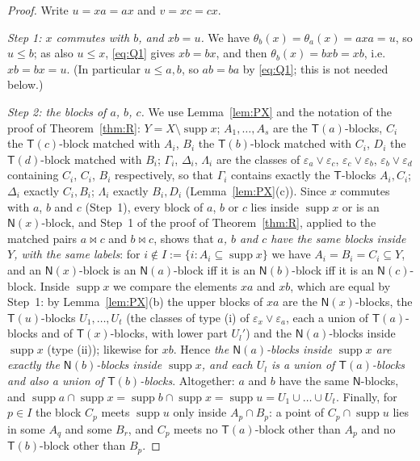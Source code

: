 \documentclass[11pt]{amsart}
\theoremstyle{definition}
\newcommand{\supp}{\operatorname{supp}}
\newcommand{\T}{\mathsf{T}}
\newcommand{\N}{\mathsf{N}}
\newcommand{\mt}{\bowtie}   %
\begin{document}
\begin{proof}
Write $u=xa=ax$ and $v=xc=cx$.

\smallskip
\emph{Step 1: $x$ commutes with $b$, and $xb=u$.} We have $\theta_b(x)=\theta_a(x)=axa=u$, so $u\le b$; as also $u\le x$, \eqref{eq:Q1} gives $xb=bx$, and then $\theta_b(x)=bxb=xb$, i.e.\ $xb=bx=u$. (In particular $u\le a,b$, so $ab=ba$ by \eqref{eq:Q1}; this is not needed below.)

\smallskip
\emph{Step 2: the blocks of $a$, $b$, $c$.} We use Lemma~\ref{lem:PX} and the notation of the proof of Theorem~\ref{thm:R}: $Y=X\setminus\supp x$; $A_1,\dots,A_s$ are the $\T(a)$-blocks, $C_i$ the $\T(c)$-block matched with $A_i$, $B_i$ the $\T(b)$-block matched with $C_i$, $D_i$ the $\T(d)$-block matched with $B_i$; $\Gamma_i$, $\Delta_i$, $\Lambda_i$ are the classes of $\varepsilon_a\vee\varepsilon_c$, $\varepsilon_c\vee\varepsilon_b$, $\varepsilon_b\vee\varepsilon_d$ containing $C_i$, $C_i$, $B_i$ respectively, so that $\Gamma_i$ contains exactly the $\T$-blocks $A_i,C_i$; $\Delta_i$ exactly $C_i,B_i$; $\Lambda_i$ exactly $B_i,D_i$ (Lemma~\ref{lem:PX}(c)). Since $x$ commutes with $a$, $b$ and $c$ (Step~1), every block of $a$, $b$ or $c$ lies inside $\supp x$ or is an $\N(x)$-block, and Step~1 of the proof of Theorem~\ref{thm:R}, applied to the matched pairs $a\mt c$ and $b\mt c$, shows that \emph{$a$, $b$ and $c$ have the same blocks inside $Y$, with the same labels}: for $i\notin I:=\{i:A_i\subseteq\supp x\}$ we have $A_i=B_i=C_i\subseteq Y$, and an $\N(x)$-block is an $\N(a)$-block iff it is an $\N(b)$-block iff it is an $\N(c)$-block. Inside $\supp x$ we compare the elements $xa$ and $xb$, which are equal by Step~1: by Lemma~\ref{lem:PX}(b) the upper blocks of $xa$ are the $\N(x)$-blocks, the $\T(u)$-blocks $U_1,\dots,U_t$ (the classes of type (i) of $\varepsilon_x\vee\varepsilon_a$, each a union of $\T(a)$-blocks and of $\T(x)$-blocks, with lower part $U_l'$) and the $\N(a)$-blocks inside $\supp x$ (type (ii)); likewise for $xb$. Hence \emph{the $\N(a)$-blocks inside $\supp x$ are exactly the $\N(b)$-blocks inside $\supp x$, and each $U_l$ is a union of $\T(a)$-blocks and also a union of $\T(b)$-blocks}. Altogether: $a$ and $b$ have the same $\N$-blocks, and $\supp a\cap\supp x=\supp b\cap\supp x=\supp u=U_1\cup\dots\cup U_t$. Finally, for $p\in I$ the block $C_p$ meets $\supp u$ only inside $A_p\cap B_p$: a point of $C_p\cap\supp u$ lies in some $A_q$ and some $B_r$, and $C_p$ meets no $\T(a)$-block other than $A_p$ and no $\T(b)$-block other than $B_p$.


\end{proof}
\end{document}
